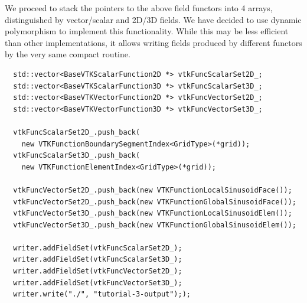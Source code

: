 \noindent
We proceed to stack the pointers to the above field functors into 4 arrays, distinguished by vector/scalar and 2D/3D fields. We have decided to use dynamic polymorphism to implement this functionality. While this may be less efficient than other implementations, it allows writing fields produced by different functors by the very same compact routine.

\begin{mybox}
\begin{lstlisting}    
  std::vector<BaseVTKScalarFunction2D *> vtkFuncScalarSet2D_;
  std::vector<BaseVTKScalarFunction3D *> vtkFuncScalarSet3D_;
  std::vector<BaseVTKVectorFunction2D *> vtkFuncVectorSet2D_;
  std::vector<BaseVTKVectorFunction3D *> vtkFuncVectorSet3D_;

  vtkFuncScalarSet2D_.push_back(
    new VTKFunctionBoundarySegmentIndex<GridType>(*grid));
  vtkFuncScalarSet3D_.push_back(
    new VTKFunctionElementIndex<GridType>(*grid));

  vtkFuncVectorSet2D_.push_back(new VTKFunctionLocalSinusoidFace());
  vtkFuncVectorSet2D_.push_back(new VTKFunctionGlobalSinusoidFace());
  vtkFuncVectorSet3D_.push_back(new VTKFunctionLocalSinusoidElem());
  vtkFuncVectorSet3D_.push_back(new VTKFunctionGlobalSinusoidElem());

  writer.addFieldSet(vtkFuncScalarSet2D_);
  writer.addFieldSet(vtkFuncScalarSet3D_);
  writer.addFieldSet(vtkFuncVectorSet2D_);
  writer.addFieldSet(vtkFuncVectorSet3D_);
  writer.write("./", "tutorial-3-output"););
\end{lstlisting}
\end{mybox}
	
